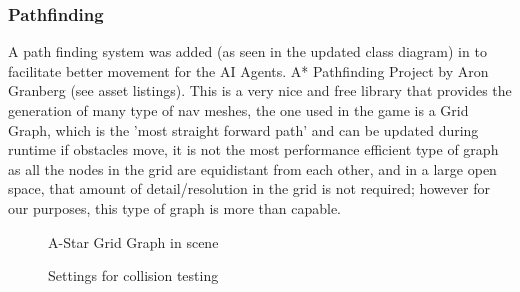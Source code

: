 \documentclass[11pt]{report}
\begin{document}
\subsubsection{Pathfinding}
A path finding system was added (as seen in the updated class diagram) in to facilitate better movement for the AI Agents. A* Pathfinding Project by Aron Granberg (see asset listings). This is a very nice and free library that provides the generation of many type of nav meshes, the one used in the game is a Grid Graph, which is the 'most straight forward path' and can be updated during runtime if obstacles move, it is not the most performance efficient type of graph as all the nodes in the grid are equidistant from each other, and in a large open space, that amount of detail/resolution in the grid is not required; however for our purposes, this type of graph is more than capable. 
\cite{astarPathfinding}
\begin{figure}[H]
    \begin{minipage}{.5\textwidth}
        \centering
        \caption{A-Star Grid Graph in scene}
    \end{minipage}
    \begin{minipage}{.5\textwidth}
        \centering
        \caption{Settings for collision testing}
    \end{minipage}
\end{figure}
\end{document}
